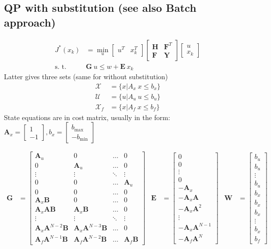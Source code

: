 \documentclass[landscape,a4paper,8pt]{scrartcl}
\newcommand{\mc}[1]{\mathcal{#1}}
\newcommand\vA{\bm{A}}
\newcommand\vB{\bm{B}}
\newcommand\vE{\bm{E}}
\newcommand\vF{\bm{F}}
\newcommand\vG{\bm{G}}
\newcommand\vH{\bm{H}}
\newcommand\vW{\bm{W}}
\newcommand\vY{\bm{Y}}
\newcommand{\Me}[1]{\begin{bmatrix}#1\end{bmatrix}} %
\begin{document}
\begin{multicols*}{3}
\subsection{QP with substitution (see also Batch approach)}
\begin{align*}
J^*(x_k) & = \min_u \Me{u^T & x_k^T}\Me{\vH & \vF^T \\ \vF & \vY}\Me{u \\ x_k} \\
\text{s. t. } & \vG\ u \leq w + \vE\ x_k
\end{align*}
Latter gives three sets (same for without substitution)
\begin{align*}
\mc{X}   & = \{ x | A_x\ x \leq b_x\} \\
\mc{U}   & = \{ u | A_u\ u \leq b_u\} \\
\mc X_f & = \{ x | A_f\ x \leq b_f\}
\end{align*}
State equations are in cost matrix, usually in the form: $\vA_x = \Me{1 \\ -1}, b_x = \Me{b_\text{max} \\ -b_\text{min}}$
\begin{scriptsize}
\setlength{\arraycolsep}{2pt}
\begin{align*}
\vG & = \Me{\vA_u & 0 & \dots & 0 \\
          0 & \vA_u & \dots & 0 \\
          \vdots & \vdots & \ddots & \vdots \\
					0      & 0 & \dots & \vA_u \\
					0      & 0 & \dots & 0 \\
					\vA_x\vB & 0 & \dots & 0 \\
					\vA_x\vA\vB & \vA_x\vB & \dots & 0 \\
					\vdots & \vdots & \ddots & \vdots \\
					\vA_x\vA^{N-2}\vB & \vA_x\vA^{N-3}\vB & \dots & 0 \\
					\vA_f\vA^{N-1}\vB & \vA_f\vA^{N-2}\vB & \dots & \vA_f\vB} &
\vE & = \Me{0 \\ 0 \\ \vdots \\ 0 \\ -\vA_x \\ -\vA_x\vA \\ -\vA_x\vA^2 \\ \vdots \\ -\vA_x\vA^{N-1} \\ -\vA_f\vA^N} &
\vW & = \Me{b_u \\ b_u \\ \vdots \\ b_u \\ b_x \\ b_x \\ b_x \\ \vdots \\ b_x \\ b_f}
\end{align*}
\end{scriptsize}


\end{multicols*}
\end{document}
